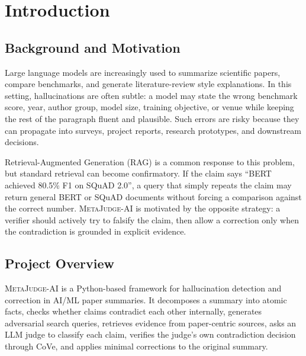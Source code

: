 \documentclass[12pt, a4paper]{report}
\newcommand{\sys}{\textsc{MetaJudge-AI}}
\begin{document}
\cleardoublepage

\tableofcontents
\cleardoublepage

\onehalfspacing

\chapter{Introduction}

\section{Background and Motivation}

Large language models are increasingly used to summarize scientific papers,
compare benchmarks, and generate literature-review style explanations. In this
setting, hallucinations are often subtle: a model may state the wrong benchmark
score, year, author group, model size, training objective, or venue while keeping
the rest of the paragraph fluent and plausible. Such errors are risky because
they can propagate into surveys, project reports, research prototypes, and
downstream decisions.

Retrieval-Augmented Generation (RAG) is a common response to this problem, but
standard retrieval can become confirmatory. If the claim says ``BERT achieved
80.5\% F1 on SQuAD 2.0'', a query that simply repeats the claim may return
general BERT or SQuAD documents without forcing a comparison against the correct
number. \sys{} is motivated by the opposite strategy: a verifier should actively
try to falsify the claim, then allow a correction only when the contradiction is
grounded in explicit evidence.

\section{Project Overview}

\sys{} is a Python-based framework for hallucination detection and correction in
AI/ML paper summaries. It decomposes a summary into atomic facts, checks whether
claims contradict each other internally, generates adversarial search queries,
retrieves evidence from paper-centric sources, asks an LLM judge to classify each
claim, verifies the judge's own contradiction decision through CoVe, and applies
minimal corrections to the original summary.
\end{document}
